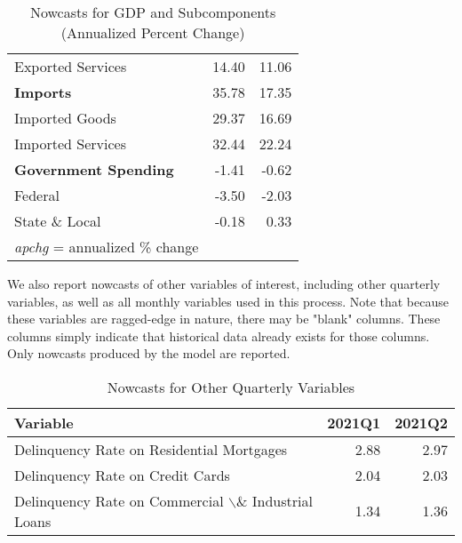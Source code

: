 \documentclass[11pt, letterpaper]{article}\usepackage[]{graphicx}\usepackage[]{color}
\begin{document}
\begin{table}[H]
\begin{tabular}{lrr}
  \hspace{8mm}  Exported Services & 14.40 & 11.06 \\ 
  \hspace{0mm} \textbf{Imports} & 35.78 & 17.35 \\ 
  \hspace{8mm}  Imported Goods & 29.37 & 16.69 \\ 
  \hspace{8mm}  Imported Services & 32.44 & 22.24 \\ 
  \hspace{0mm} \textbf{Government Spending} & -1.41 & -0.62 \\ 
  \hspace{8mm}  Federal & -3.50 & -2.03 \\ 
  \hspace{8mm}  State \& Local & -0.18 & 0.33 \\ 
   \hline 
 \textit{apchg} = annualized \% change 
\end{tabular}
\endgroup
\caption{Nowcasts for GDP and Subcomponents (Annualized Percent Change)} 
\end{table}


We also report nowcasts of other variables of interest, including other quarterly variables, as well as all monthly variables used in this process. Note that because these variables are ragged-edge in nature, there may be "blank" columns. These columns simply indicate that historical data already exists for those columns. Only nowcasts produced by the model are reported.
\begin{table}[H]
\centering
\begingroup\fontsize{11pt}{13pt}\selectfont
\begin{tabular}{lrr}
  \hline
Variable & 2021Q1 & 2021Q2 \\ 
  \hline
Delinquency Rate on Residential Mortgages & 2.88 & 2.97 \\ 
  Delinquency Rate on Credit Cards & 2.04 & 2.03 \\ 
  Delinquency Rate on Commercial $\backslash$\& Industrial Loans & 1.34 & 1.36 \\ 
   \hline
\end{tabular}
\endgroup
\caption{Nowcasts for Other Quarterly Variables} 
\end{table}
\end{document}
